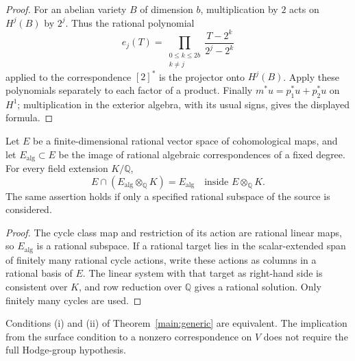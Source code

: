 \begin{proof}
For an abelian variety $B$ of dimension $b$, multiplication by $2$ acts on $H^j(B)$ by $2^j$. Thus the rational polynomial
\[
 e_j(T)=\prod_{\substack{0\le k\le 2b\\k\ne j}}
 \frac{T-2^k}{2^j-2^k}
\]
applied to the correspondence $[2]^*$ is the projector onto $H^j(B)$. Apply these polynomials separately to each factor of a product. Finally $m^*u=p_1^*u+p_2^*u$ on $H^1$; multiplication in the exterior algebra, with its usual signs, gives the displayed formula.
\end{proof}

\begin{lemma}\label{cyc:descent}
Let $E$ be a finite-dimensional rational vector space of cohomological maps, and let $E_{\mathrm{alg}}\subset E$ be the image of rational algebraic correspondences of a fixed degree. For every field extension $K/\mathbb Q$,
\[
 E\cap(E_{\mathrm{alg}}\otimes_{\mathbb Q}K)=E_{\mathrm{alg}}
 \quad\text{inside }E\otimes_{\mathbb Q}K.
\]
The same assertion holds if only a specified rational subspace of the source is considered.
\end{lemma}

\begin{proof}
The cycle class map and restriction of its action are rational linear maps, so $E_{\mathrm{alg}}$ is a rational subspace. If a rational target lies in the scalar-extended span of finitely many rational cycle actions, write these actions as columns in a rational basis of $E$. The linear system with that target as right-hand side is consistent over $K$, and row reduction over $\mathbb Q$ gives a rational solution. Only finitely many cycles are used.
\end{proof}

\begin{proposition}\label{cyc:equivalence}
Conditions \textup{(i)} and \textup{(ii)} of Theorem~\ref{main:generic} are equivalent. The implication from the surface condition to a nonzero correspondence on $V$ does not require the full Hodge-group hypothesis.
\end{proposition}

